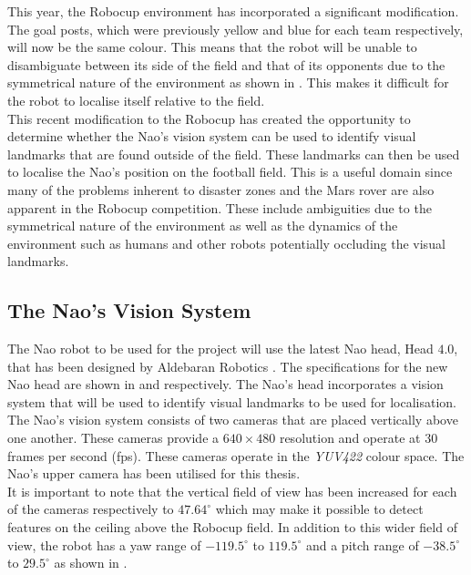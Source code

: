This year, the Robocup environment has incorporated a significant modification. The goal posts, which were previously yellow and blue for each team respectively, will now be the same colour. This means that the robot will be unable to disambiguate between its side of the field and that of its opponents due to the symmetrical nature of the environment as shown in . This makes it difficult for the robot to localise itself relative to the field.\\

This recent modification to the Robocup has created the opportunity to determine whether the Nao's vision system can be used to identify visual landmarks that are found outside of the field. These landmarks can then be used to localise the Nao's position on the football field. This is a useful domain since many of the problems inherent to disaster zones and the Mars rover are also apparent in the Robocup competition. These include ambiguities due to the symmetrical nature of the environment as well as the dynamics of the environment such as humans and other robots potentially occluding the visual landmarks.\\

\subsection{The Nao's Vision System}
\label{sec:naoSpecs}
The Nao robot to be used for the project will use the latest Nao head, Head $4.0$, that has been designed by Aldebaran Robotics \citep{NaoHead, irp}. The specifications for the new Nao head are shown in  and  respectively. The Nao's head incorporates a vision system that will be used to identify visual landmarks to be used for localisation.\\

The Nao's vision system consists of two cameras that are placed vertically above one another. These cameras provide a $640 \times 480$ resolution and operate at $30$ frames per second (fps). These cameras operate in the \textit{YUV422} colour space. The Nao's upper camera has been utilised for this thesis.\\

It is important to note that the vertical field of view has been increased for each of the cameras respectively to $47.64^\circ$ which may make it possible to detect features on the ceiling above the Robocup field. In addition to this wider field of view, the robot has a yaw range of $-119.5^\circ$ to $119.5^\circ$ and a pitch range of $-38.5^\circ$ to $29.5^\circ$ as shown in .\\ 

